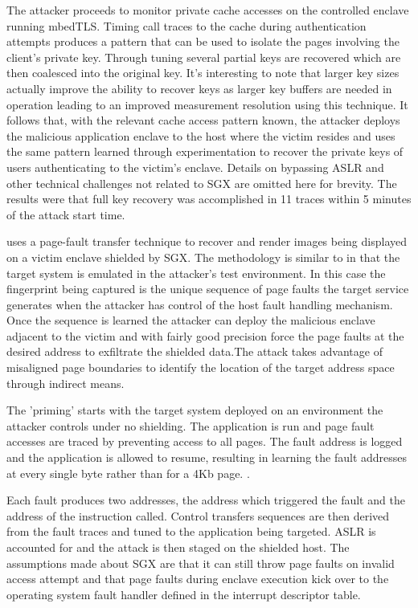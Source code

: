 The attacker proceeds to monitor private cache accesses on the controlled enclave running mbedTLS. Timing call traces to the cache during authentication attempts produces a pattern that can be used to isolate the pages involving the client's private key. Through tuning several partial keys are recovered which are then coalesced into the original key. It's interesting to note that larger key sizes actually improve the ability to recover keys as larger key buffers are needed in operation leading to an improved measurement resolution using this technique. It follows that, with the relevant cache access pattern known, the attacker deploys the malicious application enclave to the host where the victim resides and uses the same pattern learned through experimentation to recover the private keys of users authenticating to the victim's enclave. Details on bypassing ASLR and other technical challenges not related to SGX are omitted here for brevity. The results were that full key recovery was accomplished in 11 traces within 5 minutes of the attack start time.\cite{Schwarz_Weiser_Gruss_Maurice_Mangard_2017}

\cite{Xu_Cui_Peinado_2015} uses a page-fault transfer technique to recover and render images being displayed on a victim enclave shielded by SGX. The methodology is similar to \cite{Schwarz_Weiser_Gruss_Maurice_Mangard_2017} in that the target system is emulated in the attacker's test environment. In this case the fingerprint being captured is the unique sequence of page faults the target service generates when the attacker has control of the host fault handling mechanism. Once the sequence is learned the attacker can deploy the malicious enclave adjacent to the victim and with fairly good precision force the page faults at the desired address to exfiltrate the shielded data.The attack takes advantage of misaligned page boundaries to identify the location of the target address space through indirect means.

The 'priming' starts with the target system deployed on an environment the attacker controls under no shielding. The application is run and page fault accesses are traced by preventing access to all pages. The fault address is logged and the application is allowed to resume, resulting in learning the fault addresses at every single byte rather than for a 4Kb page. .

Each fault produces two addresses, the address which triggered the fault and the address of the instruction called. Control transfers sequences are then derived from the fault traces and tuned to the application being targeted. ASLR is accounted for and the attack is then staged on the shielded host. The assumptions made about SGX are that it can still throw page faults on invalid access attempt and that page faults during enclave execution kick over to the operating system fault handler defined in the interrupt descriptor table. 

